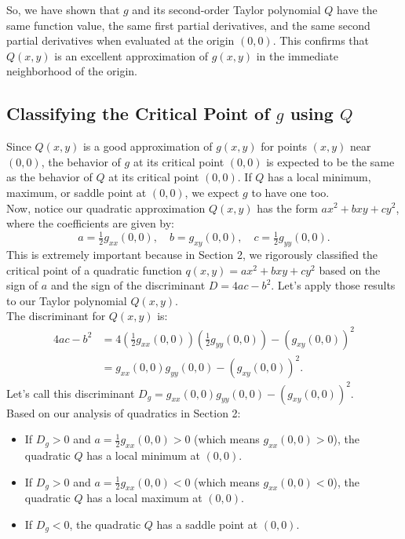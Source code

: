 \documentclass{article}
\begin{document}
So, we have shown that \( g \) and its second-order Taylor polynomial \( Q \) have the same function value, the same first partial derivatives, and the same second partial derivatives when evaluated at the origin \( (0,0) \). This confirms that \( Q(x,y) \) is an excellent approximation of \( g(x,y) \) in the immediate neighborhood of the origin.

\subsection{Classifying the Critical Point of \( g \) using \( Q \)}

Since \( Q(x,y) \) is a good approximation of \( g(x,y) \) for points \( (x,y) \) near \( (0,0) \), the behavior of \( g \) at its critical point \( (0,0) \) is expected to be the same as the behavior of \( Q \) at its critical point \( (0,0) \). If \( Q \) has a local minimum, maximum, or saddle point at \( (0,0) \), we expect \( g \) to have one too. \\

Now, notice our quadratic approximation \( Q(x,y) \) has the form \( ax^2 + bxy + cy^2 \), where the coefficients are given by:
\[
	a = \tfrac{1}{2}g_{xx}(0,0), \quad b = g_{xy}(0,0), \quad c = \tfrac{1}{2}g_{yy}(0,0).
\]
This is extremely important because in Section 2, we rigorously classified the critical point of a quadratic function \( q(x,y) = ax^2 + bxy + cy^2 \) based on the sign of \( a \) and the sign of the discriminant \( D = 4ac - b^2 \). Let's apply those results to our Taylor polynomial \( Q(x,y) \). \\

The discriminant for \( Q(x,y) \) is:
\begin{align*}
	4ac - b^2 &= 4 \left( \tfrac{1}{2}g_{xx}(0,0) \right) \left( \tfrac{1}{2}g_{yy}(0,0) \right) - (g_{xy}(0,0))^2 \\
	& = g_{xx}(0,0)g_{yy}(0,0) - (g_{xy}(0,0))^2.
\end{align*}
Let's call this discriminant \( D_g = g_{xx}(0,0)g_{yy}(0,0) - (g_{xy}(0,0))^2 \). \\

Based on our analysis of quadratics in Section 2:
\begin{itemize}
	\item If \( D_g > 0 \) and \( a = \tfrac{1}{2}g_{xx}(0,0) > 0 \) (which means \( g_{xx}(0,0) > 0 \)), the quadratic \( Q \) has a local minimum at \( (0,0) \).
	\item If \( D_g > 0 \) and \( a = \tfrac{1}{2}g_{xx}(0,0) < 0 \) (which means \( g_{xx}(0,0) < 0 \)), the quadratic \( Q \) has a local maximum at \( (0,0) \).
	\item If \( D_g < 0 \), the quadratic \( Q \) has a saddle point at \( (0,0) \).
\end{itemize}
\end{document}
